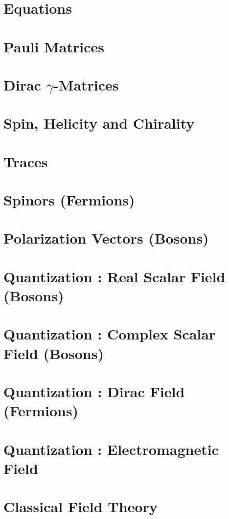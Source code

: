 \documentclass[landscape,8pt,a4paper,english]{extarticle}
\begin{document}
\begin{multicols*}{3}\centering
        \section*{Equations}
        \section*{Pauli Matrices}
        \section*{Dirac $\gamma$-Matrices}
        \section*{Spin, Helicity and Chirality}
        \section*{Traces}
        \section*{Spinors (Fermions)}
        \section*{Polarization Vectors (Bosons)}
        \section*{Quantization : Real Scalar Field (Bosons)}
        \section*{Quantization : Complex Scalar Field (Bosons)}
        \section*{Quantization : Dirac Field (Fermions)}
        \section*{Quantization : Electromagnetic Field}
        \section*{Classical Field Theory}

\end{multicols*}
\end{document}
